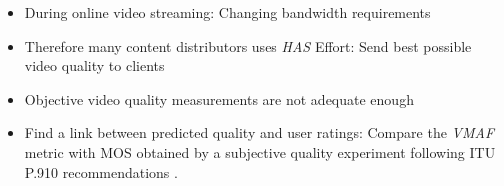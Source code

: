 \begin{itemize}
	\item During online video streaming:
	\newline Changing bandwidth requirements
	\item Therefore many content distributors uses \textit{HAS} \cite{seufert:2015:hassurvey}
	\newline Effort: Send best possible video quality to clients 
	\item Objective video quality measurements are not adequate enough
	\item Find a link between predicted quality and user ratings:
	\newline Compare the \textit{VMAF} metric \cite{lin2013:mmf,lin2014:fvqa} with MOS obtained by a subjective quality experiment following ITU P.910 recommendations \cite{rec1998p}.
\end{itemize}